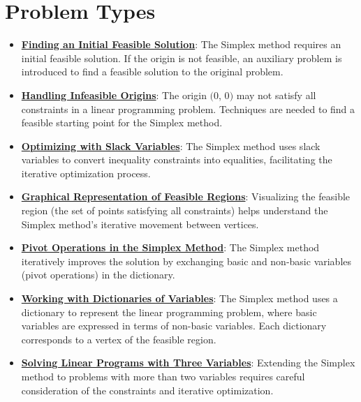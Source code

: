 \documentclass{article}%
\begin{document}
\section{Problem Types}%
\label{sec:ProblemTypes}%
\begin{itemize}[leftmargin=*]%
\item \href{https://www.math.purdue.edu/~yipn/421/2024-08-27-ExSimplex.pdf#page=32}{\textbf{Finding an Initial Feasible Solution}}: The Simplex method requires an initial feasible solution. If the origin is not feasible, an auxiliary problem is introduced to find a feasible solution to the original problem.%
\item \href{https://www.math.purdue.edu/~yipn/421/2024-08-27-ExSimplex.pdf#page=30}{\textbf{Handling Infeasible Origins}}: The origin $($0, 0$)$ may not satisfy all constraints in a linear programming problem. Techniques are needed to find a feasible starting point for the Simplex method.%
\item \href{https://www.math.purdue.edu/~yipn/421/2024-08-27-ExSimplex.pdf#page=1}{\textbf{Optimizing with Slack Variables}}: The Simplex method uses slack variables to convert inequality constraints into equalities, facilitating the iterative optimization process.%
\item \href{https://www.math.purdue.edu/~yipn/421/2024-08-27-ExSimplex.pdf#page=2}{\textbf{Graphical Representation of Feasible Regions}}: Visualizing the feasible region (the set of points satisfying all constraints) helps understand the Simplex method's iterative movement between vertices.%
\item \href{https://www.math.purdue.edu/~yipn/421/2024-08-27-ExSimplex.pdf#page=9}{\textbf{Pivot Operations in the Simplex Method}}: The Simplex method iteratively improves the solution by exchanging basic and non-basic variables (pivot operations) in the dictionary.%
\item \href{https://www.math.purdue.edu/~yipn/421/2024-08-27-ExSimplex.pdf#page=26}{\textbf{Working with Dictionaries of Variables}}: The Simplex method uses a dictionary to represent the linear programming problem, where basic variables are expressed in terms of non-basic variables. Each dictionary corresponds to a vertex of the feasible region.%
\item \href{https://www.math.purdue.edu/~yipn/421/2024-08-27-ExSimplex.pdf#page=17}{\textbf{Solving Linear Programs with Three Variables}}: Extending the Simplex method to problems with more than two variables requires careful consideration of the constraints and iterative optimization.%
\end{itemize}%
\end{document}
